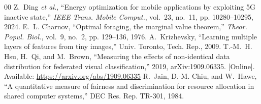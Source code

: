 \documentclass[conference,a4paper]{IEEEtran}
\begin{document}
\begin{thebibliography}{00}
 Z.~Ding \emph{et al.}, ``Energy optimization for mobile applications by exploiting 5G inactive state,'' \emph{IEEE Trans. Mobile Comput.}, vol.~23, no.~11, pp. 10280--10295, 2024.
 E.~L. Charnov, ``Optimal foraging, the marginal value theorem,'' \emph{Theor. Popul. Biol.}, vol.~9, no.~2, pp. 129--136, 1976.
 A.~Krizhevsky, ``Learning multiple layers of features from tiny images,'' Univ. Toronto, Tech. Rep., 2009.
 T.-M.~H. Hsu, H.~Qi, and M.~Brown, ``Measuring the effects of non-identical data distribution for federated visual classification,'' 2019, arXiv:1909.06335. [Online]. Available: \url{https://arxiv.org/abs/1909.06335}
 R.~Jain, D.-M. Chiu, and W.~Hawe, ``A quantitative measure of fairness and discrimination for resource allocation in shared computer systems,'' DEC Res. Rep. TR-301, 1984.
\end{thebibliography}
\end{document}
